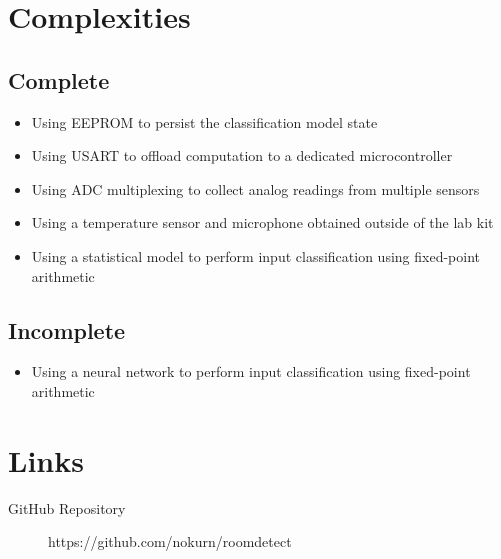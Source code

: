 \documentclass{article}
\begin{document}
\section{Complexities}

\subsection{Complete}

\begin{itemize}

  \item Using EEPROM to persist the classification model state

  \item Using USART to offload computation to a dedicated
    microcontroller

  \item Using ADC multiplexing to collect analog readings from multiple
    sensors

  \item Using a temperature sensor and microphone obtained outside of
    the lab kit

  \item Using a statistical model to perform input classification using
    fixed-point arithmetic

\end{itemize}

\subsection{Incomplete}

\begin{itemize}

  \item Using a neural network to perform input classification using
    fixed-point arithmetic

\end{itemize}

\section{Links}

\begin{description}


  \item [GitHub Repository] https://github.com/nokurn/roomdetect

\end{description}
\end{document}

